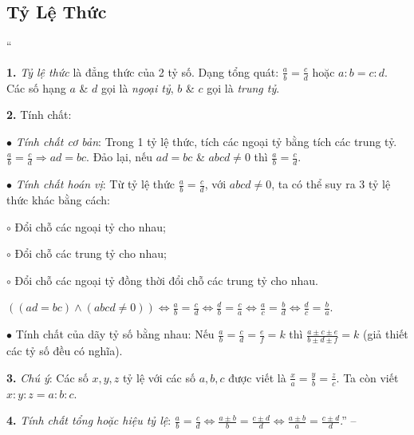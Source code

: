\documentclass{article}
\numberwithin{equation}{section}
\begin{document}
\subsection{Tỷ Lệ Thức}
``\begin{enumerate*}
	\item[\textbf{1.}] \textit{Tỷ lệ thức} là đẳng thức của 2 tỷ số. Dạng tổng quát: $\frac{a}{b} = \frac{c}{d}$ hoặc $a:b = c:d$. Các số hạng $a$ \& $d$ gọi là \textit{ngoại tỷ}, $b$ \& $c$ gọi là \textit{trung tỷ}.
	\item[\textbf{2.}] Tính chất:
	\begin{enumerate*}
		\item[$\bullet$] \textit{Tính chất cơ bản}: Trong 1 tỷ lệ thức, tích các ngoại tỷ bằng tích các trung tỷ. $\frac{a}{b} = \frac{c}{d}\Rightarrow ad = bc$. Đảo lại, nếu $ad = bc$ \& $abcd\ne 0$ thì $\frac{a}{b} = \frac{c}{d}$.
		\item[$\bullet$] \textit{Tính chất hoán vị}: Từ tỷ lệ thức $\frac{a}{b} = \frac{c}{d}$, với $abcd\ne 0$, ta có thể suy ra 3 tỷ lệ thức khác bằng cách:
		\begin{enumerate*}
			\item[$\circ$] Đổi chỗ các ngoại tỷ cho nhau;
			\item[$\circ$] Đổi chỗ các trung tỷ cho nhau;
			\item[$\circ$] Đổi chỗ các ngoại tỷ đồng thời đổi chỗ các trung tỷ cho nhau.
		\end{enumerate*}
		$((ad = bc)\land(abcd\ne 0))\Leftrightarrow\frac{a}{b} = \frac{c}{d}\Leftrightarrow\frac{d}{b} = \frac{c}{a}\Leftrightarrow\frac{a}{c} = \frac{b}{d}\Leftrightarrow\frac{d}{c} = \frac{b}{a}$.
		\item[$\bullet$] Tính chất của dãy tỷ số bằng nhau: Nếu $\frac{a}{b} = \frac{c}{d} = \frac{e}{f} = k$ thì $\frac{a\pm c\pm e}{b\pm d\pm f} = k$ (giả thiết các tỷ số đều có nghĩa).
	\end{enumerate*}
	\item[\textbf{3.}] \textit{Chú ý}: Các số $x,y,z$ tỷ lệ với các số $a,b,c$ được viết là $\frac{x}{a} = \frac{y}{b} = \frac{z}{c}$. Ta còn viết $x:y:z = a:b:c$.
	\item[\textbf{4.}] \textit{Tính chất tổng hoặc hiệu tỷ lệ}: $\frac{a}{b} = \frac{c}{d}\Leftrightarrow\frac{a\pm b}{b} = \frac{c\pm d}{d}\Leftrightarrow\frac{a\pm b}{a} = \frac{c\pm d}{d}$.'' -- \cite[Chap. 2, \S5, pp. 25--26]{Tuyen_Toan_7}
\end{enumerate*}
\end{document}

